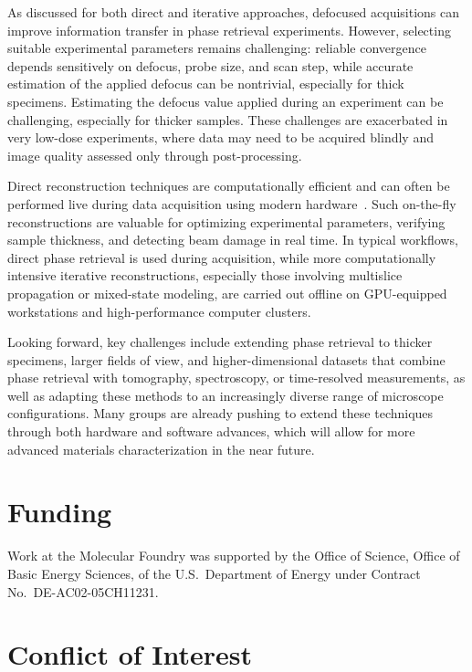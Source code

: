 \documentclass[pdflatex,sn-aps,iicol]{sn-jnl}%
\begin{document}
As discussed for both direct and iterative approaches, defocused acquisitions can improve information transfer in phase retrieval experiments.
However, selecting suitable experimental parameters remains challenging: reliable convergence depends sensitively on defocus, probe size, and scan step, while accurate estimation of the applied defocus can be nontrivial, especially for thick specimens.
Estimating the defocus value applied during an experiment can be challenging, especially for thicker samples.
These challenges are exacerbated in very low-dose experiments, where data may need to be acquired blindly and image quality assessed only through post-processing.

Direct reconstruction techniques are computationally efficient and can often be performed live during data acquisition using modern hardware~\cite{Yu_2022,Ooe_2021,Pelz_2022,Strauch_2021}.
Such on-the-fly reconstructions are valuable for optimizing experimental parameters, verifying sample thickness, and detecting beam damage in real time.
In typical workflows, direct phase retrieval is used during acquisition, while more computationally intensive iterative reconstructions, especially those involving multislice propagation or mixed-state modeling, are carried out offline on GPU-equipped workstations and high-performance computer clusters.

Looking forward, key challenges include extending phase retrieval to thicker specimens, larger fields of view, and higher-dimensional datasets that combine phase retrieval with tomography, spectroscopy, or time-resolved measurements, as well as adapting these methods to an increasingly diverse range of microscope configurations.
Many groups are already pushing to extend these techniques through both hardware and software advances, which will allow for more advanced materials characterization in the near future.

\section*{Funding}

Work at the Molecular Foundry was supported by the Office of Science, Office of Basic Energy Sciences, of the U.S.\ Department of Energy under Contract No.\ DE-AC02-05CH11231.

\section*{Conflict of Interest}
\end{document}
